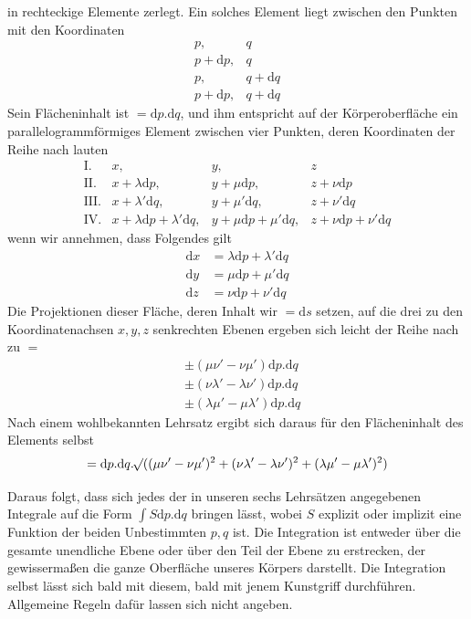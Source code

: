 in rechteckige Elemente zerlegt. Ein solches Element liegt zwischen den Punkten mit den Koordinaten
\[
\begin{array}{ll}
p,&q\\
p+\mathrm{d}p,&q\\
p,&q+\mathrm{d}q\\
p+\mathrm{d}p,&q+\mathrm{d}q
\end{array}
\]
Sein Flächeninhalt ist $=\mathrm{d}p.\mathrm{d}q$, und ihm entspricht auf der Körperoberfläche ein parallelogrammförmiges Element zwischen vier Punkten, deren Koordinaten der Reihe nach lauten
\[
\begin{array}{rlll}
\mathrm{I.}&x,&y,&z\\
\mathrm{II.}&x+\lambda\mathrm{d}p,&y+\mu\mathrm{d}p,&z+\nu\mathrm{d}p\\
\mathrm{III.}&x+\lambda'\mathrm{d}q,&y+\mu'\mathrm{d}q,&z+\nu'\mathrm{d}q\\
\mathrm{IV.}&x+\lambda\mathrm{d}p+\lambda'\mathrm{d}q,&y+\mu\mathrm{d}p+\mu'\mathrm{d}q,&z+\nu\mathrm{d}p+\nu'\mathrm{d}q
\end{array}
\]
wenn wir annehmen, dass Folgendes gilt
\[
\begin{aligned}
\mathrm{d}x&=\lambda\mathrm{d}p+\lambda'\mathrm{d}q\\
\mathrm{d}y&=\mu\mathrm{d}p+\mu'\mathrm{d}q\\
\mathrm{d}z&=\nu\mathrm{d}p+\nu'\mathrm{d}q
\end{aligned}
\]
Die Projektionen dieser Fläche, deren Inhalt wir $=\mathrm{d}s$ setzen, auf die drei zu den Koordinatenachsen $x,y,z$ senkrechten Ebenen ergeben sich leicht der Reihe nach zu $=$
\[
\begin{aligned}
&\pm(\mu\nu'-\nu\mu')\mathrm{d}p.\mathrm{d}q\\
&\pm(\nu\lambda'-\lambda\nu')\mathrm{d}p.\mathrm{d}q\\
&\pm(\lambda\mu'-\mu\lambda')\mathrm{d}p.\mathrm{d}q
\end{aligned}
\]
Nach einem wohlbekannten Lehrsatz ergibt sich daraus für den Flächeninhalt des Elements selbst
\[
=\mathrm{d}p.\mathrm{d}q.\mathord{{}^{}\!\surd}((\mu\nu'-\nu\mu')^2+(\nu\lambda'-\lambda\nu')^2+(\lambda\mu'-\mu\lambda')^2)
\]
\par\endgroup
\par
Daraus folgt, dass sich jedes der in unseren sechs Lehrsätzen angegebenen Integrale auf die Form $\int S\mathrm{d}p.\mathrm{d}q$ bringen lässt, wobei $S$ explizit oder implizit eine Funktion der beiden Unbestimmten $p,q$ ist. Die Integration ist entweder über die gesamte unendliche Ebene oder über den Teil der Ebene zu erstrecken, der gewissermaßen die ganze Oberfläche unseres Körpers darstellt. Die Integration selbst lässt sich bald mit diesem, bald mit jenem Kunstgriff durchführen. Allgemeine Regeln dafür lassen sich nicht angeben.
